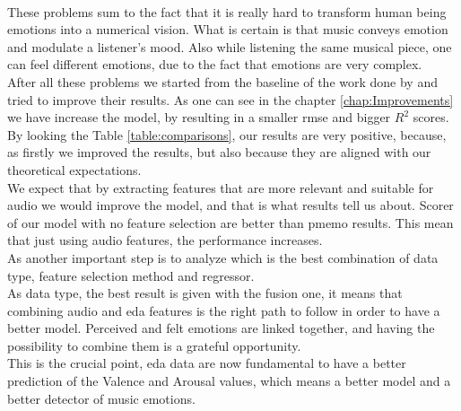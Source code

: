 \\ \indent
These problems sum to the fact that it is really hard to transform human being emotions into a numerical vision. What is certain is that music conveys emotion and modulate a listener's mood. Also while listening the same musical piece, one can feel different emotions, due to the fact that emotions are very complex.
\\
After all these problems we started from the baseline of the work done by \cite{zhang2018pmemo} and tried to improve their results. As one can see in the chapter \ref{chap:Improvements} we have increase the model, by resulting in a smaller \gls{rmse} and bigger $R^2$ scores.
\\ \indent
By looking the Table \ref{table:comparisons}, our results are very positive, because, as firstly we improved the results, but also because they are aligned with our theoretical expectations.
\\
We expect that by extracting features that are more relevant and suitable for audio we would improve the model, and that is what results tell us about. Scorer of our model with no feature selection are better than  \gls{pmemo} results. This mean that just using audio features, the performance increases.
\\ \indent
As another important step is to analyze which is the best combination of data type, feature selection method and regressor.
\\
As data type, the best result is given with the fusion one, it means that combining audio and \gls{eda} features is the right path to follow in order to have a better model. Perceived and felt emotions are linked together, and having the possibility to combine them is a grateful opportunity.
\\
This is the crucial point, \gls{eda} data are now fundamental to have a better prediction of the Valence and Arousal values, which means a better model and a better detector of music emotions.


